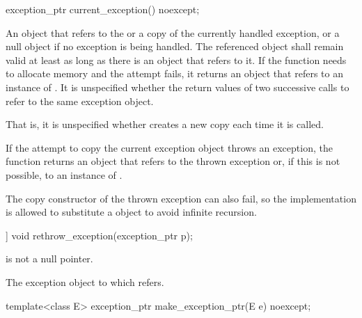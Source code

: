 %
\begin{itemdecl}
exception_ptr current_exception() noexcept;
\end{itemdecl}

\begin{itemdescr}
\pnum
\returns
An  object that refers to the
or a copy of the currently
handled exception, or a null  object if no exception is being
handled. The referenced object shall remain valid at least as long as there is an
 object that refers to it.
If the function needs to allocate memory and the attempt fails, it returns an
 object that refers to an instance of .
It is unspecified whether the return values of two successive calls to
 refer to the same exception object.
\begin{note}
That is, it is unspecified whether 
creates a new copy each time it is called.
\end{note}
If the attempt to copy the current exception object throws an exception, the function
returns an  object that refers to the thrown exception or,
if this is not possible, to an instance of .
\begin{note}
The
copy constructor of the thrown exception can also fail, so the implementation is allowed
to substitute a  object to avoid infinite
recursion.
\end{note}
\end{itemdescr}

%
\begin{itemdecl}
[[noreturn]] void rethrow_exception(exception_ptr p);
\end{itemdecl}

\begin{itemdescr}
\pnum
\expects
{} is not a null pointer.

\pnum
\throws
The exception object to which  refers.
\end{itemdescr}

%
\begin{itemdecl}
template<class E> exception_ptr make_exception_ptr(E e) noexcept;
\end{itemdecl}

